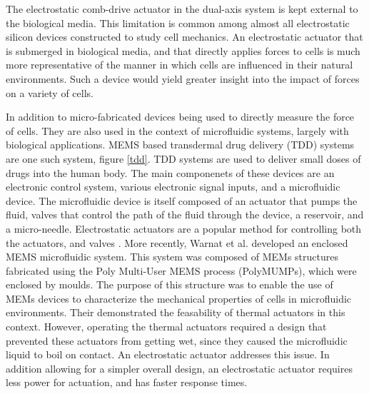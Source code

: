 
The electrostatic comb-drive actuator in the dual-axis system is kept external to the biological media. This limitation is common among almost all electrostatic silicon devices constructed to study cell mechanics. An electrostatic actuator that is submerged in biological media, and that directly applies forces to cells is much more representative of the manner in which cells are influenced in their natural environments. Such a device would yield greater insight into the impact of forces on a variety of cells. 

In addition to micro-fabricated devices being used to directly measure the force of cells. They are also used in the context of microfluidic systems, largely with biological applications. MEMS based transdermal drug delivery (TDD) systems are one such system, figure \ref{tdd}. TDD systems are used to deliver small doses of drugs into the human body\cite{Ashraf2011}. The main componenets of these devices are an electronic control system, various electronic signal inputs, and a microfluidic device. The microfluidic device is itself composed of an actuator that pumps the fluid, valves that control the path of the fluid through the device, a reservoir, and a micro-needle. Electrostatic actuators are a popular method for controlling both the actuators, and valves \cite{Ashraf2011}.  More recently, Warnat et al. developed an enclosed MEMS microfluidic system\cite{Warnat2016}. This system was composed of MEMs structures fabricated using the Poly Multi-User MEMS process (PolyMUMPs), which were enclosed by moulds\cite{Warnat2016}. The purpose of this structure was to enable the use of MEMs devices to characterize the mechanical properties of cells in microfluidic environments\cite{Warnat2016}. Their demonstrated the feasability of thermal actuators in this context. However, operating the thermal actuators required a design that prevented these actuators from getting wet, since they caused the microfluidic liquid to boil on contact\cite{Warnat2016}. An electrostatic actuator addresses this issue. In addition allowing for a simpler overall design, an electrostatic actuator requires less power for actuation, and has faster response times.

